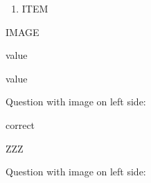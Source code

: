 \documentclass{article}
\begin{document}
\noindent\begin{minipage}[t]{0.5\linewidth}
\begin{enumerate}
    \item ITEM
\end{enumerate}
\end{minipage}\hfill
\begin{minipage}[t]{0.5\linewidth}
IMAGE
\end{minipage}

\begin{enumext*}[mini-env=0.6\linewidth, mini-right={HOLA},columns=2,noitemsep]
    \item value \item value
\end{enumext*}


{}
\begin{enumext}[save-ans=simplemc,columns=1,nosep,save-ref=true]
\item Question with image on left side:
\begin{minipage}[t]{0.5\linewidth}
\begin{keyans}[columns=1,noitemsep]
    \item*[other note] correct
\end{keyans}
\end{minipage}
\begin{minipage}[t]{0.5\linewidth}
ZZZ
\end{minipage}
\item Question with image on left side:
\end{enumext}
\end{document}
